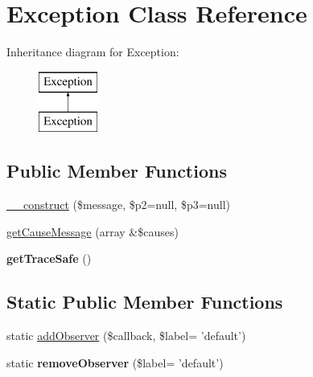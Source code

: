 \hypertarget{class_p_e_a_r2_1_1_exception}{
\section{\-Exception \-Class \-Reference}
\label{class_p_e_a_r2_1_1_exception}
}
\-Inheritance diagram for \-Exception\-:\begin{figure}[H]
\begin{center}
\leavevmode
\includegraphics[height=2.000000cm]{class_p_e_a_r2_1_1_exception}
\end{center}
\end{figure}
\subsection*{\-Public \-Member \-Functions}
\begin{DoxyCompactItemize}
\item 
\hyperlink{class_p_e_a_r2_1_1_exception_a67c5e674888283173defbcbb65c52677}{\-\_\-\-\_\-construct} (\$message, \$p2=null, \$p3=null)
\item 
\hyperlink{class_p_e_a_r2_1_1_exception_ae6e62c450fbf2ac0a98e7c298ec28a6d}{get\-Cause\-Message} (array \&\$causes)
\item 
\hypertarget{class_p_e_a_r2_1_1_exception_a4b44bdc08deded3f53f07b4dbf5e4037}{
{\bfseries get\-Trace\-Safe} ()}
\label{class_p_e_a_r2_1_1_exception_a4b44bdc08deded3f53f07b4dbf5e4037}

\end{DoxyCompactItemize}
\subsection*{\-Static \-Public \-Member \-Functions}
\begin{DoxyCompactItemize}
\item 
static \hyperlink{class_p_e_a_r2_1_1_exception_af85daa39ef3df0244a5f17a7fb2d044f}{add\-Observer} (\$callback, \$label= 'default')
\item 
\hypertarget{class_p_e_a_r2_1_1_exception_aaf4649e65c5836be3dfbd15ebaca11ca}{
static {\bfseries remove\-Observer} (\$label= 'default')}
\label{class_p_e_a_r2_1_1_exception_aaf4649e65c5836be3dfbd15ebaca11ca}

\end{DoxyCompactItemize}


